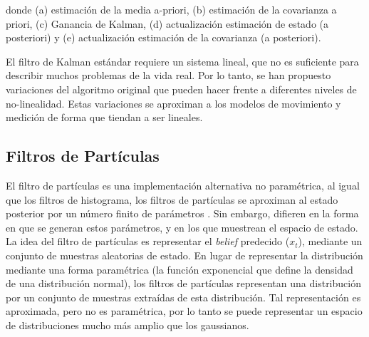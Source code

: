 donde (a) estimación de la media a-priori, (b) estimación de la covarianza a priori, 
(c) Ganancia de Kalman, (d) actualización estimación de estado (a posteriori) y 
(e) actualización estimación de la covarianza (a posteriori).


El filtro de Kalman estándar requiere un sistema lineal, que no es suficiente para 
describir muchos problemas de la vida real. Por lo tanto, se han propuesto 
variaciones del algoritmo original que pueden hacer frente a diferentes niveles de 
no-linealidad. Estas variaciones se aproximan a los modelos de movimiento y medición 
de forma que tiendan a ser lineales.


\subsection{Filtros de Part\'iculas}
El filtro de part\'iculas es una implementaci\'on alternativa no param\'etrica, al 
igual que los filtros de histograma, los filtros de part\'iculas se aproximan al 
estado posterior por un n\'umero finito de par\'ametros \cite{arulampalam2002tutorial}. Sin 
embargo, difieren en la forma en que se generan estos par\'ametros, y en los que 
muestrean el espacio de estado. La idea del filtro de part\'iculas es representar 
el \textit{belief} predecido ($x_{t}$), mediante un conjunto de muestras aleatorias de 
estado. En lugar de representar la distribuci\'on mediante una forma param\'etrica 
(la funci\'on exponencial que define la densidad de una distribuci\'on normal), los 
filtros de part\'iculas representan una distribuci\'on por un conjunto de muestras 
extra\'idas de esta distribuci\'on. Tal representaci\'on es aproximada, pero 
no es param\'etrica, por lo tanto se puede representar un espacio de distribuciones 
mucho m\'as amplio que los gaussianos.


